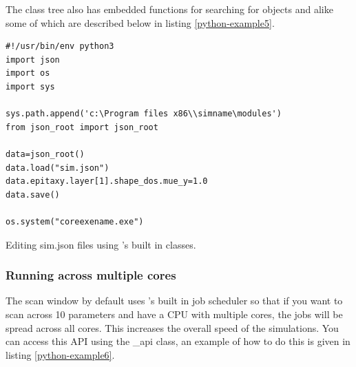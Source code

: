 The \simname class tree also has embedded functions for searching for objects and alike some of which are described below in listing \ref{python-example5}.

\begin{listing}
\begin{verbatim}
#!/usr/bin/env python3
import json
import os
import sys

sys.path.append('c:\Program files x86\\simname\modules')
from json_root import json_root

data=json_root()
data.load("sim.json")
data.epitaxy.layer[1].shape_dos.mue_y=1.0
data.save()

os.system("coreexename.exe")

\end{verbatim}
\caption{Editing sim.json files using \simname's built in classes.} 
\label{python-example5}
\end{listing}

\subsubsection{Running \simname across multiple cores}
The scan window by default uses \simname's built in job scheduler so that if you want to scan across 10 parameters and have a CPU with multiple cores, the jobs will be spread across all cores.  This increases the overall speed of the simulations. You can access this API using the \simname\_api class, an example of how to do this is given in listing \ref{python-example6}.

